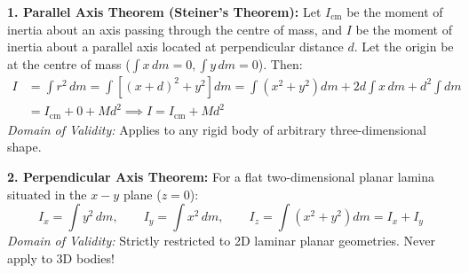 \documentclass[10pt,a4paper]{article}
\begin{document}
\begin{formulabox}
\textbf{1. Parallel Axis Theorem (Steiner's Theorem):}
Let $I_{\text{cm}}$ be the moment of inertia about an axis passing through the centre of mass, and $I$ be the moment of inertia about a parallel axis located at perpendicular distance $d$.
Let the origin be at the centre of mass ($\int x\,dm = 0, \int y\,dm = 0$). Then:
\begin{align}
  I &= \int r^2\,dm = \int \left[(x + d)^2 + y^2\right] dm = \int (x^2 + y^2)dm + 2d\int x\,dm + d^2\int dm \nonumber \\
  &= I_{\text{cm}} + 0 + M d^2 \implies I = I_{\text{cm}} + M d^2
\end{align}
\textit{Domain of Validity:} Applies to any rigid body of arbitrary three-dimensional shape.

\textbf{2. Perpendicular Axis Theorem:}
For a flat two-dimensional planar lamina situated in the $x-y$ plane ($z = 0$):
\begin{equation}
  I_x = \int y^2\,dm, \qquad I_y = \int x^2\,dm, \qquad I_z = \int (x^2 + y^2)dm = I_x + I_y
\end{equation}
\textit{Domain of Validity:} Strictly restricted to 2D laminar planar geometries. Never apply to 3D bodies!
\end{formulabox}
\end{document}
